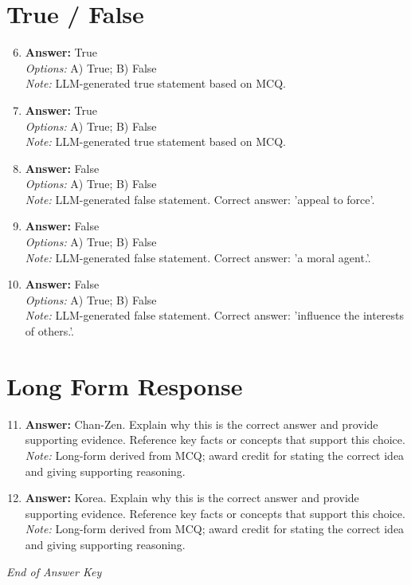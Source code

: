 \documentclass[12pt]{article}
\begin{document}
\section*{True / False}
\begin{enumerate}[label=\arabic*.]
\setcounter{enumi}{5}
\item \textbf{Answer:} True
\\ \textit{Options:} A) True; B) False
\\ \textit{Note:} LLM-generated true statement based on MCQ.
\item \textbf{Answer:} True
\\ \textit{Options:} A) True; B) False
\\ \textit{Note:} LLM-generated true statement based on MCQ.
\item \textbf{Answer:} False
\\ \textit{Options:} A) True; B) False
\\ \textit{Note:} LLM-generated false statement. Correct answer: 'appeal to force'.
\item \textbf{Answer:} False
\\ \textit{Options:} A) True; B) False
\\ \textit{Note:} LLM-generated false statement. Correct answer: 'a moral agent.'.
\item \textbf{Answer:} False
\\ \textit{Options:} A) True; B) False
\\ \textit{Note:} LLM-generated false statement. Correct answer: 'influence the interests of others.'.
\end{enumerate}

\section*{Long Form Response}
\begin{enumerate}[label=\arabic*.]
\setcounter{enumi}{10}
\item \textbf{Answer:} Chan-Zen. Explain why this is the correct answer and provide supporting evidence. Reference key facts or concepts that support this choice.
\\ \textit{Note:} Long-form derived from MCQ; award credit for stating the correct idea and giving supporting reasoning.
\item \textbf{Answer:} Korea. Explain why this is the correct answer and provide supporting evidence. Reference key facts or concepts that support this choice.
\\ \textit{Note:} Long-form derived from MCQ; award credit for stating the correct idea and giving supporting reasoning.
\end{enumerate}

\vfill
\noindent\textit{End of Answer Key}
\end{document}
